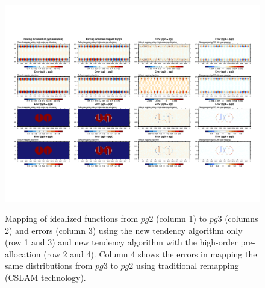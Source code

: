 \documentclass{agujournal}
\begin{document}
\begin{figure}[t]
\begin{center}
\noindent\includegraphics[width=30pc,angle=0]{mapping.pdf}\\
\end{center}
\caption{Mapping of idealized functions from $pg2$ (column 1) to $pg3$ (columns 2) and errors (column 3) using the new tendency algorithm only (row 1 and 3) and new tendency algorithm with the high-order pre-allocation (row 2 and 4). Column 4 shows the errors in mapping the same distributions from  $pg3$ to $pg2$ using traditional remapping (CSLAM technology).}
\label{fig:mapping}
\end{figure}
\end{document}
